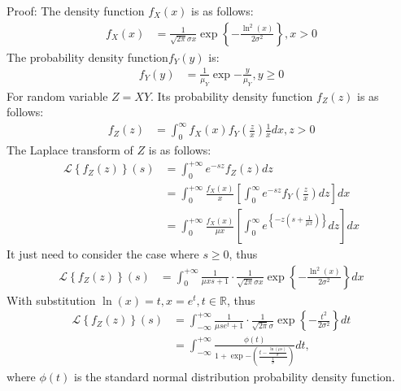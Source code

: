 Proof: The density function $f_X\left( x \right)$ is as follows:
\begin{align*}
f_X\left( x \right) &= \frac{1}{\sqrt{2\pi}\sigma x} \exp\left\lbrace -\frac{\ln^2(x)}{2 \sigma^2}\right\rbrace, x > 0
\end{align*} 
The probability density function$f_Y\left( y \right)$ is:
\begin{align*}
f_Y\left( y \right) &= \frac{1}{\mu_{Y}}\exp{-\frac{y}{\mu_{Y}}}, y \geq 0
\end{align*}
For random variable $Z=XY$. Its probability density function $f_Z\left( z\right)$ is as follows:
\begin{align*}
f_Z\left( z\right) &= \int_{0}^{\infty} f_X \left( x \right) f_Y \left( \frac{z}{x} \right) \frac{1}{x} dx , z > 0
\end{align*}
The Laplace transform of $Z$ is as follows:
\begin{align*}
	\mathcal{L}\left\lbrace f_Z\left( z\right) \right\rbrace \left(  s\right)  &= \int_{0}^{+\infty} e^{-sz} f_Z\left( z\right) dz \\
	&= \int_{0}^{+\infty} \frac{f_X \left( x \right)}{x}\left[ \int_{0}^{\infty} e^{-sz}  f_Y \left( \frac{z}{x} \right)  dz \right] dx \\
	&= \int_{0}^{+\infty} \frac{f_X \left( x \right)}{\mu x}\left[ \int_{0}^{\infty} e^{\left\lbrace -z(s+\frac{1}{\mu x}) \right\rbrace }dz \right] dx
\end{align*}
It just need to consider the case where $s \geq 0$, thus
\begin{align*}
\mathcal{L}\left\lbrace f_Z\left( z\right) \right\rbrace \left(  s\right)   
&= \int_{0}^{+\infty} \frac{1}{ \mu x s+1} \cdot \frac{1}{\sqrt{2\pi} \sigma x} \exp\left\lbrace -\frac{\ln^2(x)}{2 \sigma^2}\right\rbrace dx
\end{align*}
With substitution $\ln(x) = t, x = e^t, t \in \mathbb{R}$, thus
\begin{align}
\label{eq:laplace-transform-still-complicated}
\mathcal{L}\left\lbrace f_Z\left( z\right) \right\rbrace \left(  s\right) 
&= \int_{-\infty}^{+\infty} \frac{1}{ \mu s e^t +1} \cdot \frac{1}{\sqrt{2\pi} \sigma} \exp\left\lbrace -\frac{t^2}{2 \sigma^2}\right\rbrace dt \nonumber\\
& = \int_{-\infty}^{+\infty} \frac{\phi\left( t \right) }{1+\exp{-\left( \frac{t-\frac{\ln(\mu s)}{\sigma}}{\frac{1}{\sigma}}\right) }} dt,
\end{align}
where $\phi\left( t \right)$ is the standard normal distribution probability density function.

